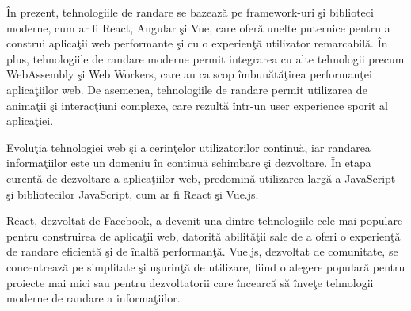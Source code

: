 \documentclass[12pt, a4paper]{report}
\begin{document}
\^ In prezent, tehnologiile de randare se bazeaz\u a pe framework-uri \c si biblioteci moderne, cum ar fi React, Angular \c si Vue, care ofer\u a unelte puternice pentru a construi aplica\c tii web performante \c si cu o experien\c t\u a utilizator remarcabil\u a. \^ In plus, tehnologiile de randare moderne permit integrarea cu alte tehnologii precum WebAssembly \c si Web Workers, care au ca scop \^ imbun\u at\u a\c tirea performan\c tei aplica\c tiilor web. De asemenea, tehnologiile de randare permit utilizarea de anima\c tii \c si interac\c tiuni complexe, care rezult\u a \^intr-un user experience sporit al aplica\c tiei.

Evolu\c tia tehnologiei web \c si a cerin\c telor utilizatorilor continu\u a, iar randarea informa\c tiilor este un domeniu \^ in continu\u a schimbare \c si dezvoltare. \^ In etapa curent\u a de dezvoltare a aplica\c tiilor web, predomin\u a utilizarea larg\u a a JavaScript \c si bibliotecilor JavaScript, cum ar fi React \c si Vue.js.

React, dezvoltat de Facebook, a devenit una dintre tehnologiile cele mai populare pentru construirea de aplica\c tii web, datorit\u a abilit\u a\c tii sale de a oferi o experien\c t\u a de randare eficient\u a \c si de \^ inalt\u a performan\c t\u a. Vue.js, dezvoltat de comunitate, se concentreaz\u a pe simplitate \c si u\c surin\c t\u a de utilizare, fiind o alegere popular\u a pentru proiecte mai mici sau pentru dezvoltatorii care \^ incearc\u a s\u a \^ inve\c te tehnologii moderne de randare a informa\c tiilor.
\end{document}
